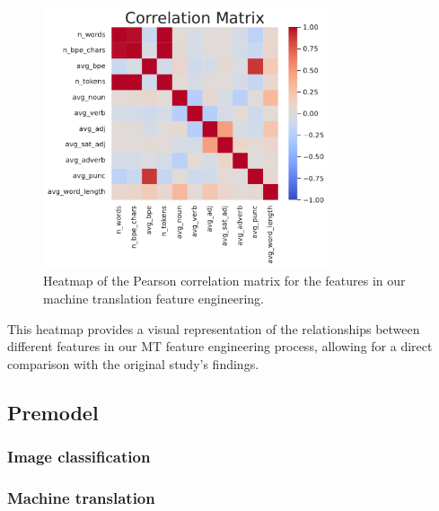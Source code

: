 \begin{figure}[h]
    \centering
    \includegraphics[width=0.75\textwidth]{figures/text_corr_matrix.pdf}
    \caption{Heatmap of the Pearson correlation matrix for the features in our machine translation feature engineering.}
    \label{fig:nlp_correlation_matrix}
\end{figure}

This heatmap provides a visual representation of the relationships between different features in our MT feature engineering process, allowing for a direct comparison with the original study's findings.



\subsection{Premodel}
\subsubsection{Image classification}
\subsubsection{Machine translation}


